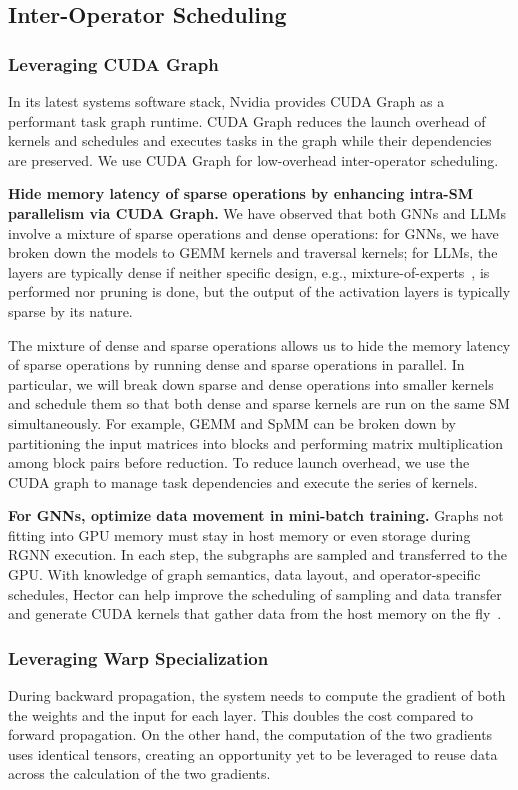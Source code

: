 \subsection{Inter-Operator Scheduling}
\subsubsection{Leveraging CUDA Graph}
In its latest systems software stack, Nvidia provides CUDA Graph as a performant task graph runtime. CUDA Graph reduces the launch overhead of kernels and schedules and executes tasks in the graph while their dependencies are preserved. We use CUDA Graph for low-overhead inter-operator scheduling. 

\noindent
\textbf{Hide memory latency of sparse operations by enhancing intra-SM parallelism via CUDA Graph.} We have observed that both GNNs and LLMs involve a mixture of sparse operations and dense operations: for GNNs, we have broken down the models to GEMM kernels and traversal kernels; for LLMs, the layers are typically dense if neither specific design, e.g., mixture-of-experts~\cite{zhouMixtureofExpertsExpertChoice2022}, is performed nor pruning is done, but the output of the activation layers is typically sparse by its nature.

The mixture of dense and sparse operations allows us to hide the memory latency of sparse operations by running dense and sparse operations in parallel. In particular, we will break down sparse and dense operations into smaller kernels and schedule them so that both dense and sparse kernels are run on the same SM simultaneously. For example, GEMM and SpMM can be broken down by partitioning the input matrices into blocks and performing matrix multiplication among block pairs before reduction. To reduce launch overhead, we use the CUDA graph to manage task dependencies and execute the series of kernels.

\noindent
\textbf{For GNNs, optimize data movement in mini-batch training.} Graphs not fitting into GPU memory must stay in host memory or even storage during RGNN execution. In each step, the subgraphs are sampled and transferred to the GPU. With knowledge of graph semantics, data layout, and operator-specific schedules, Hector can help improve the scheduling of sampling and data transfer and generate CUDA kernels that gather data from the host memory on the fly~\cite{minLargeGraphConvolutional2021}.

\subsubsection{Leveraging Warp Specialization}
During backward propagation, the system needs to compute the gradient of both the weights and the input for each layer. This doubles the cost compared to forward propagation. On the other hand, the computation of the two gradients uses identical tensors, creating an opportunity yet to be leveraged to reuse data across the calculation of the two gradients.


